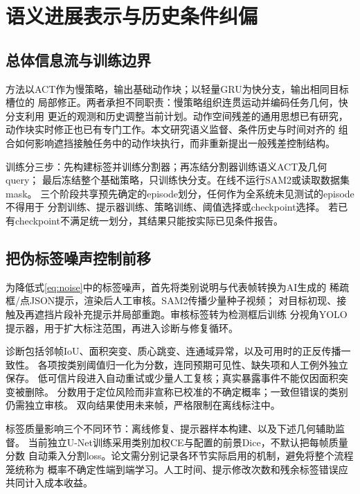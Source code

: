 \section{语义进展表示与历史条件纠偏}
\label{sec:method}
\subsection{总体信息流与训练边界}
方法以ACT作为慢策略，输出基础动作块；以轻量GRU为快分支，输出相同目标槽位的
局部修正。两者承担不同职责：慢策略组织连贯运动并编码任务几何，快分支利用
更近的观测和历史调整当前计划。动作空间残差的通用思想已有研究\cite{zeng2020}，
动作块实时修正也已有专门工作\cite{a2c2}。本文研究语义监督、条件历史与时间对齐的
组合如何影响遮挡接触任务中的动作块执行，而非重新提出一般残差控制结构。

训练分三步：先构建标签并训练分割器；再冻结分割器训练语义ACT及几何query；
最后冻结整个基础策略，只训练快分支。在线不运行SAM2或读取数据集mask。
三个阶段共享预先确定的episode划分，任何作为全系统未见测试的episode不得用于
分割训练、提示器训练、策略训练、阈值选择或checkpoint选择。
若已有checkpoint不满足统一划分，其结果只能按实际已见条件报告。

\subsection{把伪标签噪声控制前移}
为降低式\eqref{eq:noise}中的标签噪声，首先将类别说明与代表帧转换为AI生成的
稀疏框/点JSON提示，渲染后人工审核。SAM2\cite{ravi2024sam2}传播少量种子视频；
对目标初现、接触及再遮挡片段补充提示并局部重跑。审核标签转为检测框后训练
分视角YOLO提示器，用于扩大标注范围，再进入诊断与修复循环。

诊断包括邻帧IoU、面积突变、质心跳变、连通域异常，以及可用时的正反传播一致性。
各项按类别阈值归一化为分数，连同预期可见性、缺失项和人工例外独立保存。
低可信片段进入自动重试或少量人工复核；真实暴露事件不能仅因面积突变被删除。
分数用于定位风险而非宣称已校准的不确定概率；一致但错误的类别仍需独立审核。
双向结果使用未来帧，严格限制在离线标注中。

标签质量影响三个不同环节：离线修复、提示器样本构建、以及下述几何辅助监督。
当前独立U-Net训练采用类别加权CE与配置的前景Dice，不默认把每帧质量分数
自动乘入分割loss。论文需分别记录各环节实际启用的机制，避免将整个流程笼统称为
概率不确定性端到端学习。人工时间、提示修改次数和残余标签错误应共同计入成本收益。

